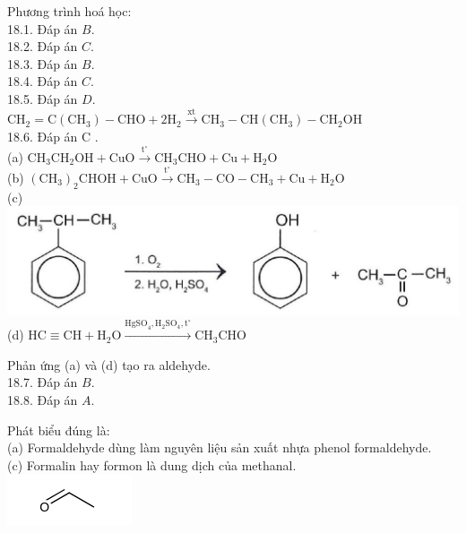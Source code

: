 \documentclass[10pt]{article}
\begin{document}
Phương trình hoá học:\\
18.1. Đáp án $B$.\\
18.2. Đáp án $C$.\\
18.3. Đáp án $B$.\\
18.4. Đáp án $C$.\\
18.5. Đáp án $D$.\\
$\mathrm{CH}_{2}=\mathrm{C}\left(\mathrm{CH}_{3}\right)-\mathrm{CHO}+2 \mathrm{H}_{2} \xrightarrow{\mathrm{xt}} \mathrm{CH}_{3}-\mathrm{CH}\left(\mathrm{CH}_{3}\right)-\mathrm{CH}_{2} \mathrm{OH}$\\
18.6. Đáp án C .\\
(a) $\mathrm{CH}_{3} \mathrm{CH}_{2} \mathrm{OH}+\mathrm{CuO} \xrightarrow{\mathrm{t}^{\circ}} \mathrm{CH}_{3} \mathrm{CHO}+\mathrm{Cu}+\mathrm{H}_{2} \mathrm{O}$\\
(b) $\left(\mathrm{CH}_{3}\right)_{2} \mathrm{CHOH}+\mathrm{CuO} \xrightarrow{\mathrm{t}^{\circ}} \mathrm{CH}_{3}-\mathrm{CO}-\mathrm{CH}_{3}+\mathrm{Cu}+\mathrm{H}_{2} \mathrm{O}$\\
(c)\\
\includegraphics[max width=\textwidth, center]{2025_10_23_adad5b98d65ac6665838g-37(1)}\\
(d) $\mathrm{HC} \equiv \mathrm{CH}+\mathrm{H}_{2} \mathrm{O} \xrightarrow{\mathrm{HgSO}_{4}, \mathrm{H}_{2} \mathrm{SO}_{4}, \mathrm{t}^{\circ}} \mathrm{CH}_{3} \mathrm{CHO}$

Phản ứng (a) và (d) tạo ra aldehyde.\\
18.7. Đáp án $B$.\\
18.8. Đáp án $A$.

Phát biểu đúng là:\\
(a) Formaldehyde dùng làm nguyên liệu sản xuất nhựa phenol formaldehyde.\\
(c) Formalin hay formon là dung dịch của methanal.\\
\includegraphics{smile-ce2a01e317b7cb450a263c59128253222e1edf4a}
\end{document}
